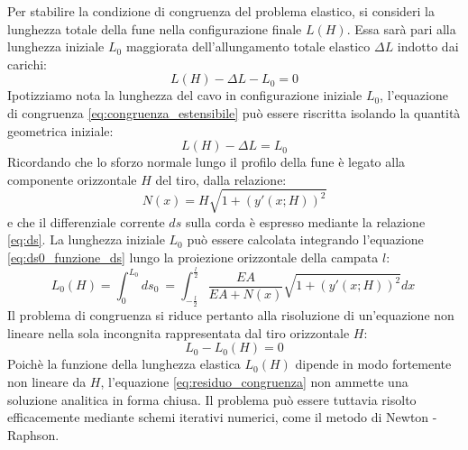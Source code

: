 Per stabilire la condizione di congruenza del problema elastico, si consideri la lunghezza totale della fune nella configurazione finale $L(H)$. Essa sarà pari alla lunghezza iniziale $L_0$ maggiorata dell'allungamento totale elastico $\Delta L$ indotto dai carichi:
\begin{equation}
   L(H) - \Delta L - L_0 = 0
   \label{eq:congruenza_estensibile}
\end{equation}
Ipotizziamo nota la lunghezza del cavo in configurazione iniziale $L_0$, l'equazione di congruenza \eqref{eq:congruenza_estensibile} può essere riscritta isolando la quantità geometrica iniziale:
\begin{equation}
   L(H) - \Delta L  = L_0
   \label{eq:congruenza_estensibile2}
\end{equation}
Ricordando che lo sforzo normale lungo il profilo della fune è legato alla componente orizzontale $H$ del tiro, dalla relazione:
\begin{equation}
   N(x) = H \sqrt{1 + (y'(x; H))^2}
   \label{eq:sforzo_normale}
\end{equation}
e che il differenziale corrente $ds$ sulla corda è espresso mediante la relazione \eqref{eq:ds}. La lunghezza iniziale $L_0$ può essere calcolata integrando l'equazione \eqref{eq:ds0_funzione_ds} lungo la proiezione orizzontale della campata $l$:
\begin{equation}
    L_0(H) = \int_{0}^{L_0} ds_0\ = \int_{-\frac{l}{2}}^{\frac{l}{2}} \frac{EA}{EA + N(x)} \sqrt{1 + (y'(x; H))^{2}} dx\
   \label{eq:lunghezza_indeformata_integer}
\end{equation}
Il problema di congruenza si riduce pertanto alla risoluzione di un'equazione non lineare nella sola incongnita rappresentata dal tiro orizzontale $H$: 
\begin{equation}
   L_0 - L_0(H) = 0 
   \label{eq:residuo_congruenza}
\end{equation}
Poichè la funzione della lunghezza elastica $L_0(H)$ dipende in modo fortemente non lineare da $H$, l'equazione \eqref{eq:residuo_congruenza} non ammette una soluzione analitica in forma chiusa. Il problema può essere tuttavia risolto efficacemente mediante schemi iterativi numerici, come il metodo di Newton - Raphson.

